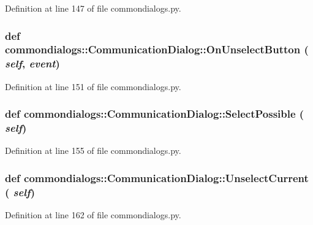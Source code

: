Definition at line 147 of file commondialogs.py.\hypertarget{classcommondialogs_1_1CommunicationDialog_c228ecfb891ba5beb759c9507118b1d5}{
\subsubsection[OnUnselectButton]{\setlength{\rightskip}{0pt plus 5cm}def commondialogs::Communication\-Dialog::On\-Unselect\-Button ( {\em self},  {\em event})}}
\label{classcommondialogs_1_1CommunicationDialog_c228ecfb891ba5beb759c9507118b1d5}




Definition at line 151 of file commondialogs.py.\hypertarget{classcommondialogs_1_1CommunicationDialog_59ad1a338abf8e3f25c43240aa5b2dab}{
\subsubsection[SelectPossible]{\setlength{\rightskip}{0pt plus 5cm}def commondialogs::Communication\-Dialog::Select\-Possible ( {\em self})}}
\label{classcommondialogs_1_1CommunicationDialog_59ad1a338abf8e3f25c43240aa5b2dab}




Definition at line 155 of file commondialogs.py.\hypertarget{classcommondialogs_1_1CommunicationDialog_102862c2ba42dbffe915fd3997eb2673}{
\subsubsection[UnselectCurrent]{\setlength{\rightskip}{0pt plus 5cm}def commondialogs::Communication\-Dialog::Unselect\-Current ( {\em self})}}
\label{classcommondialogs_1_1CommunicationDialog_102862c2ba42dbffe915fd3997eb2673}




Definition at line 162 of file commondialogs.py.


